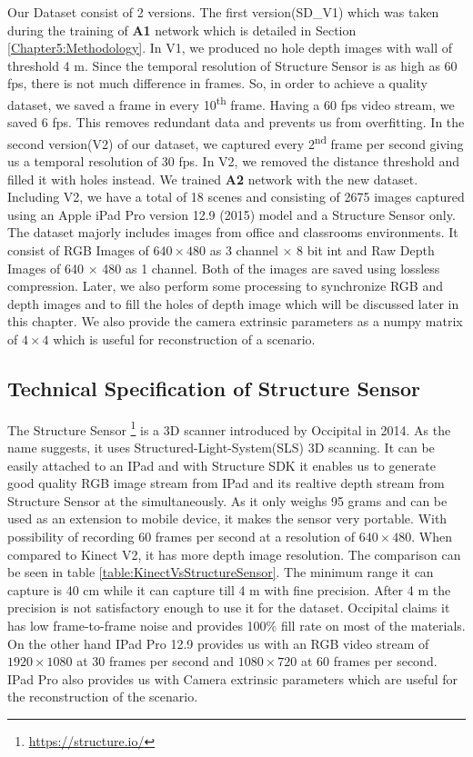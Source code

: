 Our Dataset consist of 2 versions. The first version(SD\_V1) which was taken during the training of \textbf{A1} network which is detailed in Section \ref{Chapter5:Methodology}. In V1, we produced no hole depth images with wall of threshold 4 m. Since the temporal resolution of Structure Sensor is as high as 60 fps, there is not much difference in frames. So, in order to achieve a quality dataset, we saved a frame in every 10\textsuperscript{th} frame. Having a 60 fps video stream, we saved 6 fps. This removes redundant data and prevents us from overfitting. In the second version(V2) of our dataset, we captured every 2\textsuperscript{nd} frame per second giving us a temporal resolution of 30 fps. In V2, we removed the distance threshold and filled it with holes instead. We trained \textbf{A2} network with the new dataset. Including V2, we have a total of 18 scenes and consisting of 2675 images captured using an Apple iPad Pro version 12.9 (2015) model and a Structure Sensor only. The dataset majorly includes images from office and classrooms environments. It consist of RGB Images of $640\times480$ as 3 channel $\times$ 8 bit int and Raw Depth Images of 640 $\times$ 480 as 1 channel. Both of the images are saved using lossless compression. Later, we also perform some processing to synchronize RGB and depth images and to fill the holes of depth image which will be discussed later in this chapter. We also provide the camera extrinsic parameters as a numpy matrix of $4\times4$ which is useful for reconstruction of a scenario.\\


\subsection{Technical Specification of Structure Sensor}
The Structure Sensor \footnote{\url{https://structure.io/}} is a 3D scanner introduced by Occipital in 2014. As the name suggests, it uses Structured-Light-System(SLS) 3D scanning\cite{Kalantari}. It can be easily attached to an IPad and with Structure SDK it enables us to generate good quality RGB image stream from IPad and its realtive depth stream from Structure Sensor at the simultaneously. As it only weighs 95 grams and can be used as an extension to mobile device, it makes the sensor very portable. With possibility of recording 60 frames per second at a resolution of $640\times480$\cite{Kalantari}. When compared to Kinect V2, it has more depth image resolution. The comparison can be seen in table \ref{table:KinectVsStructureSensor}. The minimum range it can capture is 40 cm while it can capture till 4 m with fine precision. After 4 m the precision is not satisfactory enough to use it for the dataset. Occipital claims it has low frame-to-frame noise and provides 100\% fill rate on most of the materials. On the other hand IPad Pro 12.9 provides us with an RGB video stream of $1920\times1080$ at 30 frames per second and $1080\times720$ at 60 frames per second. IPad Pro also provides us with Camera extrinsic parameters which are useful for the reconstruction of the scenario.\\

